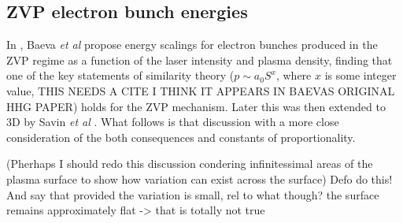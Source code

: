 \subsection{ZVP electron bunch energies}\label{sec:zvp_energies_derivation}
In \cite{baevaZeroVectorPotential2011}, Baeva \textit{et al} propose energy scalings for electron bunches produced in the \ac{ZVP} regime as a function of the laser intensity and plasma density, finding that one of the key statements of similarity theory ($p \sim a_0 S^x$, where $x$ is some integer value, THIS NEEDS A CITE I THINK IT APPEARS IN BAEVAS ORIGINAL HHG PAPER) holds for the \ac{ZVP} mechanism. Later this was then extended to \ac{3D} by Savin \textit{et al} \cite{savinAttosecondscaleAbsorptionExtreme2017}. What follows is that discussion with a more close consideration of the both consequences and constants of proportionality.

(Pherhaps I should redo this discussion condering infinitessimal areas of the plasma surface to show how variation can exist across the surface) Defo do this! And say that provided the variation is small, rel to what though? the surface remains approximately flat -> that is totally not true

